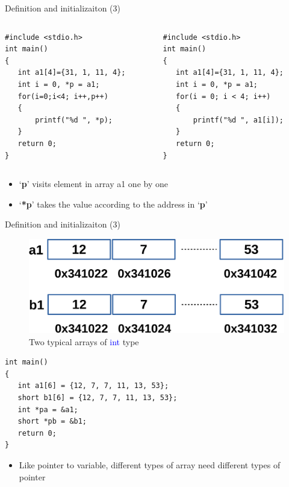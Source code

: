 \begin{frame}[fragile]{Definition and initializaiton (3)}
\vspace{-0.15in}
\begin{columns}
\begin{column}{0.46\linewidth}
\begin{lstlisting}
#include <stdio.h>
int main()
{
   int a1[4]={31, 1, 11, 4};
   int i = 0, *p = a1;
   for(i=0;i<4; i++,p++)
   {
       printf("%d ", *p);
   }
   return 0;
}
\end{lstlisting}
\end{column}
\begin{column}{0.46\linewidth}
\begin{lstlisting}
#include <stdio.h>
int main()
{
   int a1[4]={31, 1, 11, 4};
   int i = 0, *p = a1;
   for(i = 0; i < 4; i++)
   {
       printf("%d ", a1[i]);
   }
   return 0;
}
\end{lstlisting}
\end{column}
\end{columns}
\begin{itemize}
	\item {`\textbf{p}' visits element in array a1 one by one}
	\item {`\textbf{*p}' takes the value according to the address in `\textbf{p}'}
\end{itemize}
\end{frame}

\begin{frame}[fragile]{Definition and initializaiton (3)}
\begin{figure}
	\includegraphics[width=0.50\linewidth]{figs/array1.pdf}
	\caption{Two typical arrays of \textcolor{blue}{int} type}
\end{figure}
\begin{lstlisting}[xleftmargin=0.08\linewidth, linewidth=0.9\linewidth]
int main()
{
   int a1[6] = {12, 7, 7, 11, 13, 53};
   short b1[6] = {12, 7, 7, 11, 13, 53};
   int *pa = &a1;
   short *pb = &b1;
   return 0;
}
\end{lstlisting}
\begin{itemize}
	\item {Like pointer to variable, different types of array need different types of pointer}
\end{itemize}
\end{frame}

